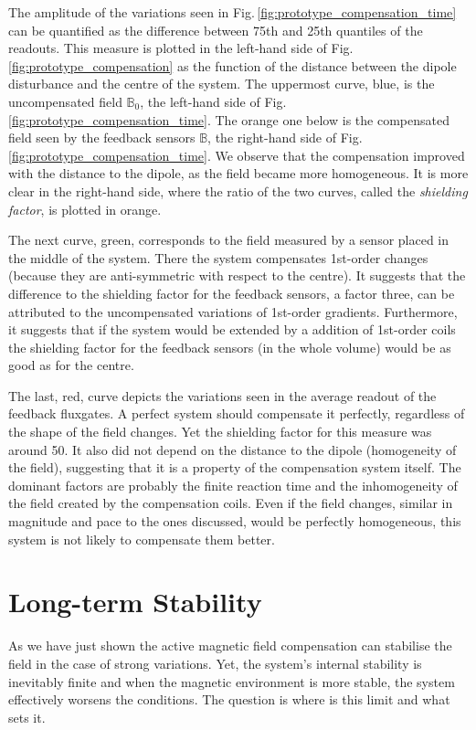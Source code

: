 The amplitude of the variations seen in Fig.\,\ref{fig:prototype_compensation_time} can be quantified as the difference between 75th and 25th quantiles of the readouts. This measure is plotted in the left-hand side of Fig.\,\ref{fig:prototype_compensation} as the function of the distance between the dipole disturbance and the centre of the system. The uppermost curve, blue, is the uncompensated field $\mathbb{B}_0$, the left-hand side of Fig.\,\ref{fig:prototype_compensation_time}. The orange one below is the compensated field seen by the feedback sensors $\mathbb{B}$, the right-hand side of Fig.\,\ref{fig:prototype_compensation_time}. We observe that the compensation improved with the distance to the dipole, as the field became more homogeneous. It is more clear in the right-hand side, where the ratio of the two curves, called the \emph{shielding factor}, is plotted in orange.

The next curve, green, corresponds to the field measured by a sensor placed in the middle of the system. There the system compensates 1st-order changes (because they are anti-symmetric with respect to the centre). It suggests that the difference to the shielding factor for the feedback sensors, a factor three, can be attributed to the uncompensated variations of 1st-order gradients. Furthermore, it suggests that if the system would be extended by a addition of 1st-order coils the shielding factor for the feedback sensors (in the whole volume) would be as good as for the centre.

The last, red, curve depicts the variations seen in the average readout of the feedback fluxgates. A perfect system should compensate it perfectly, regardless of the shape of the field changes. Yet the shielding factor for this measure was around 50. It also did not depend on the distance to the dipole (homogeneity of the field), suggesting that it is a property of the compensation system itself. The dominant factors are probably the finite reaction time and the inhomogeneity of the field created by the compensation coils. Even if the field changes, similar in magnitude and pace to the ones discussed, would be perfectly homogeneous, this system is not likely to compensate them better.


\section{Long-term Stability}
As we have just shown the active magnetic field compensation can stabilise the field in the case of strong variations. Yet, the system's internal stability is inevitably finite and when the magnetic environment is more stable, the system effectively worsens the conditions. The question is where is this limit and what sets it.

